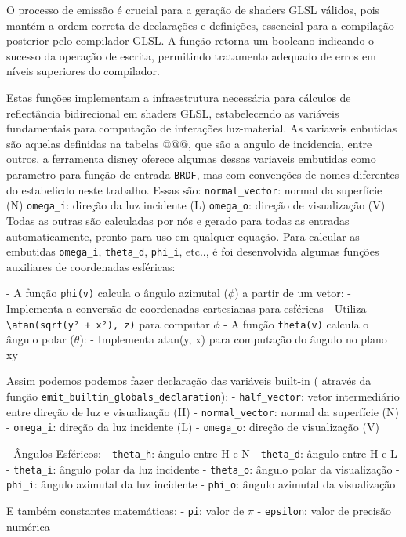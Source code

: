 O processo de emissão é crucial para a geração de shaders GLSL válidos, pois mantém a ordem correta de declarações e definições, essencial para a compilação posterior pelo compilador GLSL. A função retorna um booleano indicando o sucesso da operação de escrita, permitindo tratamento adequado de erros em níveis superiores do compilador.

Estas funções implementam a infraestrutura necessária para cálculos de reflectância bidirecional em shaders GLSL, estabelecendo as variáveis fundamentais para computação de interações luz-material. As variaveis enbutidas são aquelas definidas na tabelas @@@, que são a angulo de incidencia, entre outros, a ferramenta disney oferece algumas dessas variaveis embutidas como parametro para função de entrada \verb`BRDF`, mas com convenções de nomes diferentes do estabelicdo neste trabalho. Essas são:
      \verb`normal_vector`: normal da superfície (N)
      \verb`omega_i`: direção da luz incidente (L)
      \verb`omega_o`: direção de visualização (V)
Todas as outras são calculadas por nós e gerado para todas as entradas automaticamente, pronto para uso em qualquer equação.
Para calcular as embutidas \verb"omega_i", \verb"theta_d", \verb"phi_i", etc.., é foi desenvolvida algumas funções auxiliares de coordenadas esféricas:

   - A função \verb`phi(v)` calcula o ângulo azimutal ($\phi$) a partir de um vetor:
     - Implementa a conversão de coordenadas cartesianas para esféricas
     - Utiliza \verb"\atan(sqrt(y² + x²), z)" para computar $\phi$
   - A função \verb`theta(v)` calcula o ângulo polar ($\theta$):
     - Implementa atan(y, x) para computação do ângulo no plano xy

Assim podemos podemos fazer declaração das variáveis built-in  ( através da função \verb`emit_builtin_globals_declaration`):
     - \verb`half_vector`: vetor intermediário entre direção de luz e visualização (H)
     - \verb`normal_vector`: normal da superfície (N)
     - \verb`omega_i`: direção da luz incidente (L)
     - \verb`omega_o`: direção de visualização (V)
   
   - Ângulos Esféricos:
     - \verb`theta_h`: ângulo entre H e N
     - \verb`theta_d`: ângulo entre H e L
     - \verb`theta_i`: ângulo polar da luz incidente
     - \verb`theta_o`: ângulo polar da visualização
     - \verb`phi_i`: ângulo azimutal da luz incidente
     - \verb`phi_o`: ângulo azimutal da visualização

E também constantes matemáticas:
     - \verb`pi`: valor de $\pi$
     - \verb`epsilon`: valor de precisão numérica


